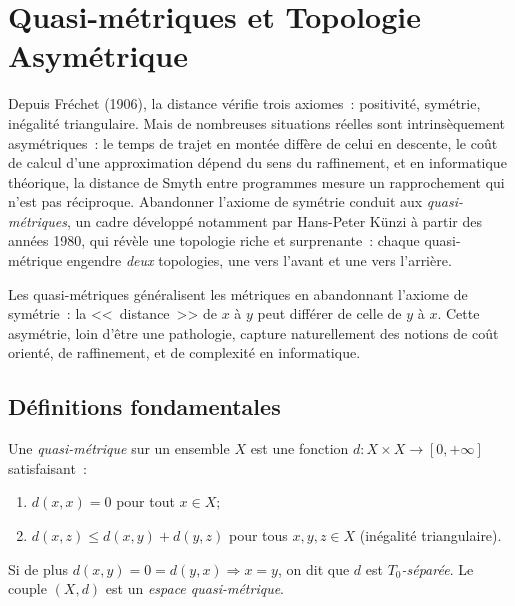 \chapter{Quasi-m\'etriques et Topologie Asym\'etrique}
\label{ch:quasi_metriques}

Depuis Fr\'echet (1906), la distance v\'erifie trois axiomes~: positivit\'e, sym\'etrie, in\'egalit\'e triangulaire. Mais de nombreuses situations r\'eelles sont intrins\`equement asym\'etriques~: le temps de trajet en mont\'ee diff\`ere de celui en descente, le co\^ut de calcul d'une approximation d\'epend du sens du raffinement, et en informatique th\'eorique, la distance de Smyth entre programmes mesure un rapprochement qui n'est pas r\'eciproque. Abandonner l'axiome de sym\'etrie conduit aux \emph{quasi-m\'etriques}, un cadre d\'evelopp\'e notamment par Hans-Peter K\"unzi \`a partir des ann\'ees 1980, qui r\'ev\`ele une topologie riche et surprenante~: chaque quasi-m\'etrique engendre \emph{deux} topologies, une vers l'avant et une vers l'arri\`ere.

\begin{intuition}
Les quasi-m\'etriques g\'en\'eralisent les m\'etriques en abandonnant l'axiome de
sym\'etrie~: la <<~distance~>> de $x$ \`a $y$ peut diff\'erer de celle de $y$ \`a $x$.
Cette asym\'etrie, loin d'\^etre une pathologie, capture naturellement des notions de co\^ut
orient\'e, de raffinement, et de complexit\'e en informatique.
\end{intuition}

\section{D\'efinitions fondamentales}

\begin{definition}
Une \emph{quasi-m\'etrique} sur un ensemble $X$ est une fonction
$d\colon X \times X \to [0,+\infty]$ satisfaisant~:
\begin{enumerate}
  \item $d(x,x) = 0$ pour tout $x \in X$;
  \item $d(x,z) \leq d(x,y) + d(y,z)$ pour tous $x,y,z \in X$ (in\'egalit\'e triangulaire).
\end{enumerate}
Si de plus $d(x,y) = 0 = d(y,x) \Rightarrow x = y$, on dit que $d$ est \emph{$T_0$-s\'epar\'ee}.
Le couple $(X,d)$ est un \emph{espace quasi-m\'etrique}.
\end{definition}

